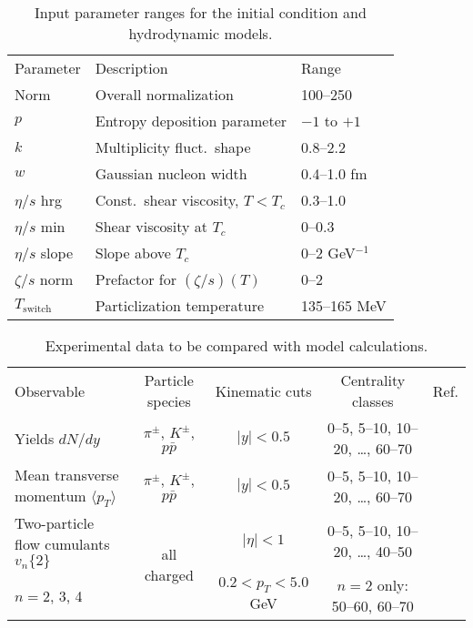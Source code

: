 \documentclass[aps,prc,reprint,amsmath,nofootinbib,noeprint]{revtex4-1}
\newcommand{\avg}[1]{\langle #1 \rangle}
\newcommand{\vnk}[2]{v_#1\{#2\}}
\newcommand{\paddedhline}{\noalign{\smallskip}\hline\noalign{\smallskip}}
\begin{document}
\begin{table}[b]
  \caption{
    \label{tab:design}
    Input parameter ranges for the initial condition and hydrodynamic models.
  }
  \begin{ruledtabular}
  \begin{tabular}{lll}
    Parameter         & Description                        & Range           \\
    \paddedhline
    Norm              & Overall normalization              & 100--250        \\
    $p$               & Entropy deposition parameter       & $-1$ to $+1$    \\
    $k$               & Multiplicity fluct.\ shape         & 0.8--2.2        \\
    $w$               & Gaussian nucleon width             & 0.4--1.0 fm     \\
    $\eta/s$ hrg      & Const.\ shear viscosity, $T < T_c$ & 0.3--1.0        \\
    $\eta/s$ min      & Shear viscosity at $T_c$           & 0--0.3          \\
    $\eta/s$ slope    & Slope above $T_c$                  & 0--2 GeV$^{-1}$ \\
    $\zeta/s$ norm    & Prefactor for $(\zeta/s)(T)$       & 0--2            \\
    $T_\text{switch}$ & Particlization temperature         & 135--165 MeV    \\
  \end{tabular}
  \end{ruledtabular}
\end{table}

\begin{table*}
  \caption{
    \label{tab:observables}
    Experimental data to be compared with model calculations.
  }
  \begin{ruledtabular}
  \begin{tabular}{lcccc}
    Observable & Particle species & Kinematic cuts & Centrality classes & Ref. \\
    \paddedhline
    Yields $dN/dy$                       & $\pi^\pm$, $K^\pm$, $p\bar p$ &
    $|y| < 0.5$ & 0--5, 5--10, 10--20, \ldots, 60--70 & \cite{Abelev:2013vea} \\
    \noalign{\smallskip}
    Mean transverse momentum $\avg{p_T}$ & $\pi^\pm$, $K^\pm$, $p\bar p$ &
    $|y| < 0.5$ & 0--5, 5--10, 10--20, \ldots, 60--70 & \cite{Abelev:2013vea} \\
    \noalign{\smallskip}
    Two-particle flow cumulants $\vnk n 2$ & \multirow{2}{*}{all charged} &
    $|\eta| < 1$ & 0--5, 5--10, 10--20, \ldots, 40--50 &
    \multirow{2}{*}{\cite{ALICE:2011ab}} \\
    $n = 2$, 3, 4 & & $0.2 < p_T < 5.0$ GeV & $n = 2$ only: 50--60, 60--70 & \\
  \end{tabular}
  \end{ruledtabular}
\end{table*}
\end{document}
